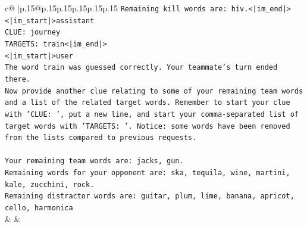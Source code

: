 \documentclass{article}
\begin{document}
{\begin{supertabular}{c@{$\;$}|p{.15\linewidth}@{}p{.15\linewidth}p{.15\linewidth}p{.15\linewidth}p{.15\linewidth}p{.15\linewidth}}
{{{\texttt{Remaining kill words are: hiv.<|im\_end|>} \\
\texttt{<|im\_start|>assistant} \\
\texttt{CLUE: journey} \\
\texttt{TARGETS: train<|im\_end|>} \\
\texttt{<|im\_start|>user} \\
\texttt{The word train was guessed correctly. Your teammate's turn ended there.} \\
\texttt{Now provide another clue relating to some of your remaining team words and a list of the related target words. Remember to start your clue with 'CLUE: ', put a new line, and start your comma{-}separated list of target words with 'TARGETS: '. Notice: some words have been removed from the lists compared to previous requests.} \\
\\ 
\texttt{Your remaining team words are: jacks, gun.} \\
\texttt{Remaining words for your opponent are: ska, tequila, wine, martini, kale, zucchini, rock.} \\
\texttt{Remaining distractor words are: guitar, plum, lime, banana, apricot, cello, harmonica} \\
            }
        }
    }
    & & \\ \\


\end{supertabular}}
\end{document}
